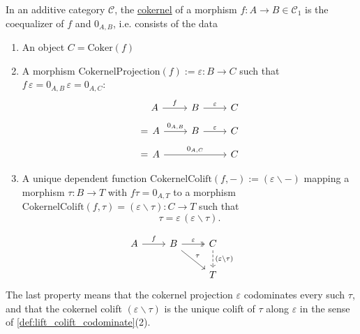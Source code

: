 \begin{definition}[Cokernel]
In an additive category $\mathcal{C}$, the \ul{cokernel} of a morphism $f : A \rightarrow B \in \mathcal{C}_{1}$ is the coequalizer of
$f$ and $0_{A,B}$, i.e. consists of the data
\begin{enumerate}
\renewcommand{\labelenumi}{(\theenumi)}
\item An object $C = \mathrm{Coker}(f)$
\item A morphism $\mathrm{CokernelProjection}(f) := \varepsilon : B \rightarrow C$ such that $f\,\varepsilon = 0_{A,B}\,\varepsilon = 0_{A,C}$:
\begin{align*}
\begin{tikzcd}[
  ampersand replacement=\&,
  row sep=1em,
]
{\phantom{=\, }A} \arrow[r, "f"]                 \& B \arrow[r, "\varepsilon"] \& C \\
{=\, A} \arrow[r, "{0_{A,B}}"]   \& B \arrow[r, "\varepsilon"] \& C \\
{= \, A} \arrow[rr, "{0_{A,C}}"] \&                            \& C
\end{tikzcd}
\end{align*}
\item A unique dependent function $\mathrm{CokernelColift}(f,-) := ( \varepsilon \backslash -)$ mapping a morphism $\tau : B \rightarrow T$ with
$f \tau  = 0_{A,T}$ to a morphism $\mathrm{CokernelColift}(f,\tau) = ( \varepsilon \backslash \tau) : C \rightarrow T$ such that
\[
\tau =\label{eq:cokernel_colift} \varepsilon \, (\varepsilon \backslash \tau).
\]
\end{enumerate}
\[
\begin{tikzcd}
A \arrow[r, "f"] & B \arrow[r, "\varepsilon", two heads] \arrow[rd, "\tau"] & C \arrow[d, "(\varepsilon\backslash\tau)", dashed] \\
                 &                                                          & T                                                 
\end{tikzcd}
\]
The last property means that the cokernel projection $\varepsilon$ codominates every such $\tau$, and that the cokernel colift
$(\varepsilon \backslash \tau)$ is the unique colift of $\tau$ along $\varepsilon$ in the sense of \ref{def:lift_colift_codominate}(2).
\end{definition}

